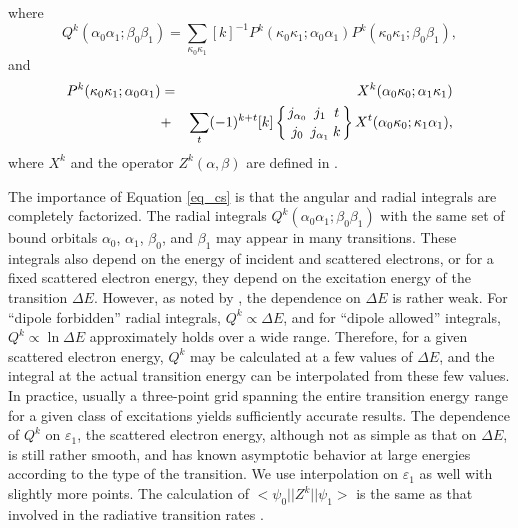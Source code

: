 \documentclass{elsart}
\newcommand{\sixj}[6]{\ensuremath{\left\{{#1\atop #4}{#2\atop #5}
{#3\atop #6}\right\}}}
\begin{document}
where 
\begin{equation}
\label{eq_Qk}
Q^k(\alpha_0\alpha_1;\beta_0\beta_1) = \sum_{\kappa_0\kappa_1}[k]^{-1}
P^k(\kappa_0\kappa_1;\alpha_0\alpha_1)P^k(\kappa_0\kappa_1;\beta_0\beta_1),
\end{equation}
and 
\begin{eqnarray}
\label{eq_Pk}
P^k(\kappa_0\kappa_1;\alpha_0\alpha_1) &=&
X^k(\alpha_0\kappa_0;\alpha_1\kappa_1) \nonumber\\ 
&+& \sum_{t}
(-1)^{k+t}[k]\sixj{j_{\alpha_0}}{j_1}{t}{j_0}{j_{\alpha_1}}{k}
X^t(\alpha_0\kappa_0;\kappa_1\alpha_1),
\end{eqnarray}
where $X^k$ and the operator $Z^k(\alpha,\beta)$ are defined in
. 
 
The importance of Equation \ref{eq_cs} is that the angular and radial integrals
are completely factorized. The radial integrals
$Q^k(\alpha_0\alpha_1;\beta_0\beta_1)$ with the same set of bound orbitals
$\alpha_0$, $\alpha_1$, $\beta_0$, and $\beta_1$ may appear in many
transitions. These integrals also depend on the energy of incident
and scattered electrons, or for a fixed scattered electron energy, they depend
on the excitation energy of the transition $\Delta E$. However, as noted by
\citet{barshalom88}, the dependence on $\Delta E$  is rather weak. For
``dipole forbidden'' radial integrals, $Q^k \propto \Delta E$, and for ``dipole
allowed'' integrals, $Q^k \propto \ln\Delta E$ approximately holds over a wide
range. Therefore, for a given scattered electron energy, $Q^k$ may be
calculated at a few values of $\Delta E$, and the integral at the actual
transition energy can be interpolated from these few values. In practice,
usually a three-point grid spanning the entire transition energy range for
a given class of excitations yields sufficiently accurate results. The
dependence of $Q^k$ on $\varepsilon_1$, the scattered electron energy,
although not as simple as that on $\Delta E$, is still rather smooth, and has
known asymptotic behavior at large energies according to the type of the
transition. We use interpolation on $\varepsilon_1$ as well with slightly more
points. The calculation of $<\psi_0||Z^k||\psi_1>$ is the same as that
involved in the radiative transition rates .
\end{document}
